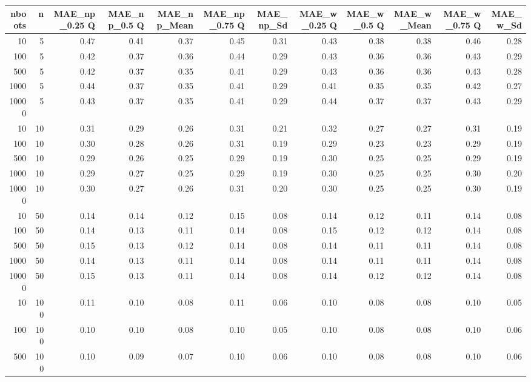 \begin{table}[ht]
\centering
\begin{tabular}{rrrrrrrrrrrr}
  \hline
nboots & n & MAE\_np\_0.25 Q & MAE\_np\_0.5 Q & MAE\_np\_Mean & MAE\_np\_0.75 Q & MAE\_np\_Sd & MAE\_w\_0.25 Q & MAE\_w\_0.5 Q & MAE\_w\_Mean & MAE\_w\_0.75 Q & MAE\_w\_Sd \\ 
  \hline
10 & 5 & 0.47 & 0.41 & 0.37 & 0.45 & 0.31 & 0.43 & 0.38 & 0.38 & 0.46 & 0.28 \\ 
  100 & 5 & 0.42 & 0.37 & 0.36 & 0.44 & 0.29 & 0.43 & 0.36 & 0.36 & 0.43 & 0.29 \\ 
  500 & 5 & 0.42 & 0.37 & 0.35 & 0.41 & 0.29 & 0.43 & 0.36 & 0.36 & 0.43 & 0.28 \\ 
  1000 & 5 & 0.44 & 0.37 & 0.35 & 0.41 & 0.29 & 0.41 & 0.35 & 0.35 & 0.42 & 0.27 \\ 
  10000 & 5 & 0.43 & 0.37 & 0.35 & 0.41 & 0.29 & 0.44 & 0.37 & 0.37 & 0.43 & 0.29 \\ 
  10 & 10 & 0.31 & 0.29 & 0.26 & 0.31 & 0.21 & 0.32 & 0.27 & 0.27 & 0.31 & 0.19 \\ 
  100 & 10 & 0.30 & 0.28 & 0.26 & 0.31 & 0.19 & 0.29 & 0.23 & 0.23 & 0.29 & 0.19 \\ 
  500 & 10 & 0.29 & 0.26 & 0.25 & 0.29 & 0.19 & 0.30 & 0.25 & 0.25 & 0.29 & 0.19 \\ 
  1000 & 10 & 0.29 & 0.27 & 0.25 & 0.29 & 0.19 & 0.30 & 0.25 & 0.25 & 0.30 & 0.20 \\ 
  10000 & 10 & 0.30 & 0.27 & 0.26 & 0.31 & 0.20 & 0.30 & 0.25 & 0.25 & 0.30 & 0.19 \\ 
  10 & 50 & 0.14 & 0.14 & 0.12 & 0.15 & 0.08 & 0.14 & 0.12 & 0.11 & 0.14 & 0.08 \\ 
  100 & 50 & 0.14 & 0.13 & 0.11 & 0.14 & 0.08 & 0.15 & 0.12 & 0.12 & 0.14 & 0.08 \\ 
  500 & 50 & 0.15 & 0.13 & 0.12 & 0.14 & 0.08 & 0.14 & 0.11 & 0.11 & 0.14 & 0.08 \\ 
  1000 & 50 & 0.14 & 0.13 & 0.11 & 0.14 & 0.08 & 0.14 & 0.11 & 0.11 & 0.14 & 0.08 \\ 
  10000 & 50 & 0.15 & 0.13 & 0.11 & 0.14 & 0.08 & 0.14 & 0.12 & 0.12 & 0.14 & 0.08 \\ 
  10 & 100 & 0.11 & 0.10 & 0.08 & 0.11 & 0.06 & 0.10 & 0.08 & 0.08 & 0.10 & 0.05 \\ 
  100 & 100 & 0.10 & 0.10 & 0.08 & 0.10 & 0.05 & 0.10 & 0.08 & 0.08 & 0.10 & 0.06 \\ 
  500 & 100 & 0.10 & 0.09 & 0.07 & 0.10 & 0.06 & 0.10 & 0.08 & 0.08 & 0.10 & 0.06 \\ 

\end{tabular}
\end{table}
